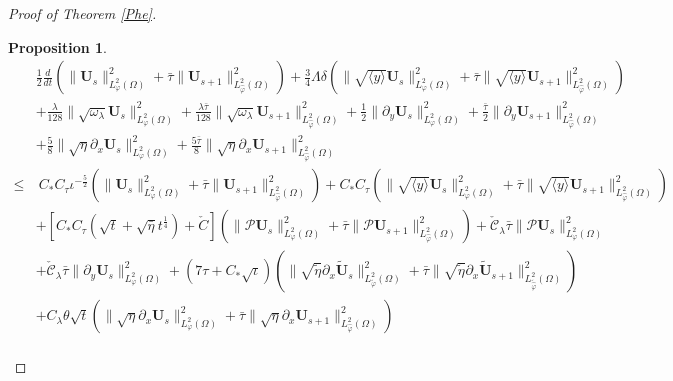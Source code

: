 \documentclass[10pt,a4paper]{amsart}
\newtheorem{prop}{Proposition}
\newcommand\y{{{\langle y \rangle}}}
\begin{document}
\begin{proof}[Proof of Theorem \ref{Phe}]
\begin{prop}
\begin{align}\label{phe}
&\frac{1}{2}\frac{d}{dt}\left(\|\mathbf{U}_{s}\|_{L_{\varphi}^{2}(\Omega)}^{2}+\bar{\tau}\|\mathbf{U}_{s+1}\|_{L_{\hat{\varphi}}^{2}(\Omega)}^{2}\right)
 +\frac{3}{4}\Lambda\delta\left(\|\sqrt{\y}\mathbf{U}_{s}\|_{L_{\varphi}^{2}(\Omega)}^{2}+\bar{\tau}\|\sqrt{\y}\mathbf{U}_{s+1}\|_{L_{\hat{\varphi}}^{2}(\Omega)}^{2}\right)\\
&+\frac{\lambda}{128}\|\sqrt{\omega_{\lambda}}\mathbf{U}_{s}\|_{L_{\varphi}^{2}(\Omega)}^{2}
 +\frac{\lambda\bar{\tau}}{128}\|\sqrt{\omega_{\lambda}}\mathbf{U}_{s+1}\|_{L_{\hat{\varphi}}^{2}(\Omega)}^{2}
 +\frac{1}{2}\|\partial_{y}\mathbf{U}_{s}\|_{L_{\varphi}^{2}(\Omega)}^{2}
 +\frac{\bar{\tau}}{2}\|\partial_{y}\mathbf{U}_{s+1}\|_{L_{\hat{\varphi}}^{2}(\Omega)}^{2}\nonumber\\
&+\frac{5}{8}\|\sqrt{\eta}\partial_{x}\mathbf{U}_{s}\|_{L_{\varphi}^{2}(\Omega)}^{2}
 +\frac{5\bar{\tau}}{8}\|\sqrt{\eta}\partial_{x}\mathbf{U}_{s+1}\|_{L_{\hat{\varphi}}^{2}(\Omega)}^{2}\nonumber\\
\leq&~C_{*}C_{\tau}\iota^{-\frac{5}{2}}
      \left(\|\mathbf{U}_{s}\|_{L_{\varphi}^{2}(\Omega)}^{2}+\bar{\tau}\|\mathbf{U}_{s+1}\|_{L_{\hat{\varphi}}^{2}(\Omega)}^{2}\right)
      +C_{*}C_{\tau}\left(\|\sqrt{\y}\mathbf{U}_{s}\|_{L_{\varphi}^{2}(\Omega)}^{2}+\bar{\tau}\|\sqrt{\y}\mathbf{U}_{s+1}\|_{L_{\hat{\varphi}}^{2}(\Omega)}^{2}\right)\nonumber\\
    &+\left[C_{*}C_{\tau}(\sqrt{t}+\sqrt{\bar{\eta}}t^{\frac{1}{4}})+\check{C}\right]
      \left(\|\mathcal{P}\mathbf{U}_{s}\|_{L_{\varphi}^{2}(\Omega)}^{2}+\bar{\tau}\|\mathcal{P}\mathbf{U}_{s+1}\|_{L_{\hat{\varphi}}^{2}(\Omega)}^{2}\right)
     +\check{\mathcal{C}}_{\lambda}\bar{\tau}\|\mathcal{P}\mathbf{U}_{s}\|_{L_{\varphi}^{2}(\Omega)}^{2}\nonumber\\
    &+\check{\mathcal{C}}_{\lambda}\bar{\tau}\|\partial_{y}\mathbf{U}_{s}\|_{L_{\varphi}^{2}(\Omega)}^{2}
     +(7\tau+C_{*}\sqrt{\iota})\left(\|\sqrt{\tilde{\eta}}\partial_{x}\tilde{\mathbf{U}}_{s}\|_{L_{\tilde{\varphi}}^{2}(\Omega)}^{2}
                                     +\bar{\tau}\|\sqrt{\tilde{\eta}}\partial_{x}\tilde{\mathbf{U}}_{s+1}\|_{L_{\tilde{\hat{\varphi}}}^{2}(\Omega)}^{2}\right)\nonumber\\
    &+C_{\lambda}\theta\sqrt{t}\left(\|\sqrt{\eta}\partial_{x}\mathbf{U}_{s}\|_{L_{\varphi}^{2}(\Omega)}^{2}
                             +\bar{\tau}\|\sqrt{\eta}\partial_{x}\mathbf{U}_{s+1}\|_{L_{\hat{\varphi}}^{2}(\Omega)}^{2}\right)\nonumber\\

\end{align}
\end{prop}
\end{proof}
\end{document}
